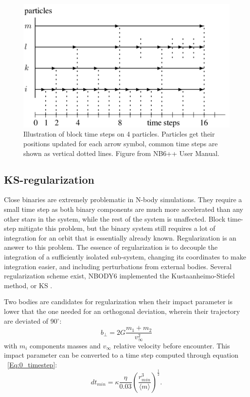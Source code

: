 \begin{figure}
\label{Fig:blocktimesteps}
\center
\includegraphics[width=0.6\linewidth]{Figures/0_block_timesteps.png}
\caption{Illustration of block time steps on 4 particles. Particles get their positions updated for each arrow symbol, common time steps are shown as vertical dotted lines. Figure from NB6++ User Manual. }
\end{figure} 
 
 
\subsection{KS-regularization}

Close binaries are extremely problematic in N-body simulations. They require a small time step as both binary components are much more accelerated than any other stars in the system, while the rest of the system is unaffected. Block time-step mitigate this problem, but the binary system still requires a lot of integration for an orbit that is essentially already known. Regularization is an answer to this problem. The essence of regularization is to decouple the integration of a sufficiently isolated sub-system, changing its coordinates to make integration easier, and including perturbations from external bodies. Several regularization scheme exist, NBODY6 implemented the Kustaanheimo-Stiefel method, or KS \citep{KS1965}.

Two bodies are candidates for regularization when their impact parameter is lower that the one needed for an orthogonal deviation, wherein their trajectory are deviated of 90$^\circ$:
\begin{equation}
b_\perp = 2G \frac{m_1 +m_2}{v^2_\infty}
\end{equation}
with $m_i$ components masses and $v_\infty$ relative velocity before encounter. This impact parameter can be converted to a time step computed through equation ~\ref{Eq:0_timestep}:
\begin{equation}
dt_{min} = \kappa \frac{\eta}{0.03} \left( \frac{r^3_{min}}{\langle m \rangle}\right)^\frac{1}{2}.
\end{equation}

